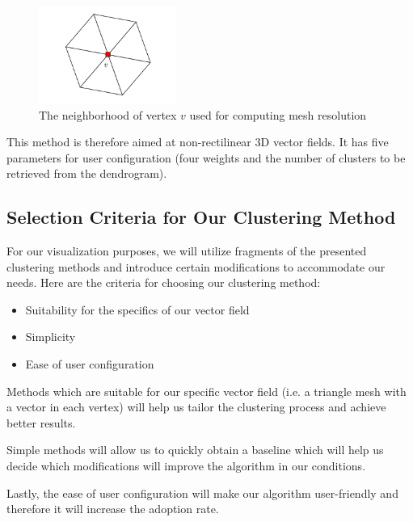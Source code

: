 
\begin{figure}[h]
	\centering
	\includegraphics[width=0.4\textwidth]{./illustrations/mesh_resolution.pdf}
	\caption[Mesh resolution]{The neighborhood of vertex \(v\) used for computing mesh resolution}
	\label{fig:illustration-mesh_resolution}
\end{figure}

This method is therefore aimed at non-rectilinear 3D vector fields. It has five parameters for user configuration (four weights and the number of clusters to be retrieved from the dendrogram).
\subsection{Selection Criteria for Our Clustering Method}
\label{subsec:analysis-field_clustering-sel_criteria}

For our visualization purposes, we will utilize fragments of the presented clustering methods and introduce certain modifications to accommodate our needs. Here are the criteria for choosing our clustering method:

\begin{itemize}
\item Suitability for the specifics of our vector field
\item Simplicity
\item Ease of user configuration
\end{itemize}

Methods which are suitable for our specific vector field (i.e. a triangle mesh with a vector in each vertex) will help us tailor the clustering process and achieve better results. 

Simple methods will allow us to quickly obtain a baseline which will help us decide which modifications will improve the algorithm in our conditions. 

Lastly, the ease of user configuration will make our algorithm user-friendly and therefore it will increase the adoption rate.

